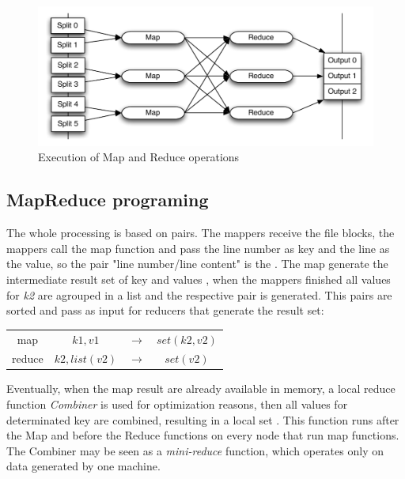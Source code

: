 \begin{figure}[htbp]
	\centering
	\includegraphics[width=\columnwidth]{img/mapreduce-en.pdf}
	\caption{Execution of Map and Reduce operations}\label{fig:mrexecute}
\end{figure}

\subsection{MapReduce programing}

The whole processing is based on  pairs. The mappers receive the
file blocks, the mappers call the map function and pass the line number as key and
the line as the value, so the pair "line number/line content" is the .
The map generate the intermediate result set of key and values , 
when the mappers finished all values for \textit{k2} are agrouped in a list and
the respective pair  is generated. This pairs are sorted and
pass as input for reducers that generate the result set:

\begin{center}
\begin{tabular}{c c c c}
	\hline
	   map & $k1,v1$ & $\rightarrow$  & $set(k2, v2)$ \\
	   reduce & $k2, list(v2)$ & $\rightarrow$ & $set(v2)$ \\
	\hline
\end{tabular}
\end{center}

Eventually, when the map result are already available in memory, a local reduce
function \emph{Combiner} is used for optimization reasons, then all values for
determinated key are combined, resulting in a local set .
This function runs after the Map and before the Reduce functions on
every node that run map functions. The Combiner may be seen as a \emph{mini-reduce}
function, which operates only on data generated by one machine.

